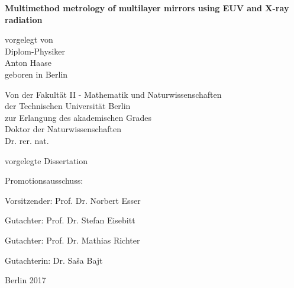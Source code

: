 
\begin{titlepage}
{\noindent\sffamily\large%
    \begin{center}
        \vspace*{3ex}
        
        {\LARGE\bfseries\sffamily
           Multimethod metrology of multilayer mirrors using EUV and X-ray radiation
        }
        \vspace{1cm}

        vorgelegt von \\
        Diplom-Physiker \\
        Anton Haase \\
        geboren in Berlin \\
        \vspace{4cm}

        Von der Fakultät II - Mathematik und Naturwissenschaften \\
        der Technischen Universität Berlin \\
        zur Erlangung des akademischen Grades \\
        Doktor der Naturwissenschaften \\
        Dr. rer. nat. \\
        \vspace{3ex}

        vorgelegte Dissertation \\
        \vspace{2cm}
    \end{center}

    Promotionsausschuss:
    \vspace{2ex}

    Vorsitzender: Prof. Dr. Norbert Esser

    Gutachter: Prof. Dr. Stefan Eisebitt

    Gutachter: Prof. Dr. Mathias Richter

    Gutachterin: Dr. Sa\v{s}a Bajt
    \vspace{1ex}


    \begin{center}
        Berlin 2017
    \end{center}
}
\end{titlepage}

\cleardoublepage

